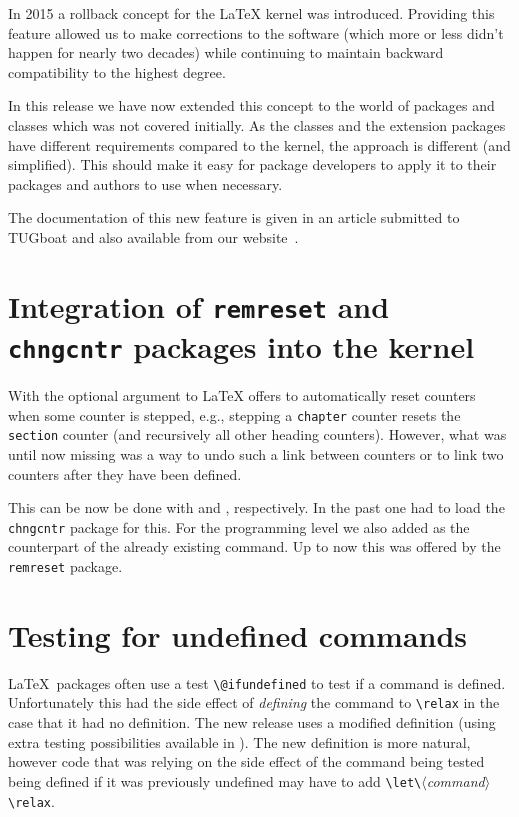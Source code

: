 \documentclass{ltnews}
\providecommand\meta[1]{$\langle$\textit{#1}$\rangle$}
\providecommand\pkg[1]{\texttt{#1}}
\begin{document}
  In 2015 a rollback concept for the \LaTeX{} kernel was introduced.
  Providing this feature allowed us to make corrections to the
  software (which more or less didn't happen for nearly two decades)
  while continuing to maintain backward compatibility to the highest
  degree.

  In this release we have now extended this concept to
  the world of packages and classes which was not covered
  initially. As the classes and the extension packages have different
  requirements compared to the kernel, the approach is different (and
  simplified). This should make it easy for package developers to
  apply it to their packages and authors to use when necessary.

  The documentation of this new feature is given in an article
  submitted to TUGboat and also available from our
  website~\cite{Mittelbach:TB39-2}.


\section[Integration of \pkg{remreset} and \pkg{chngcntr} packages]
         {Integration of \pkg{remreset} and \pkg{chngcntr} packages
         into the kernel}

With the optional argument to  \LaTeX{} offers to
automatically reset counters when some counter is stepped, e.g.,
stepping a \texttt{chapter} counter resets the \texttt{section}
counter (and recursively all other heading counters). However, what
was until now missing was a way to undo such a link between counters
or to link two counters after they have been defined.

This can be now be done with  and ,
respectively. In the past one had to load the \pkg{chngcntr} package
for this. For the programming level we also added
 as the counterpart of the already existing
 command. Up to now this was offered by the
\pkg{remreset} package.

\section{Testing for undefined commands}
\LaTeX\ packages often use a test \verb|\@ifundefined| to test if a command
is defined. Unfortunately this had the side effect of \emph{defining}
the command to \verb|\relax| in the case that it had no definition.
 The new release uses a modified definition
(using extra testing possibilities available in ). The new definition
is more natural, however code that was relying on the side effect of the
command being tested being defined if it was previously undefined may have to add
\verb|\let\|\meta{command}\verb|\relax|.
\end{document}
